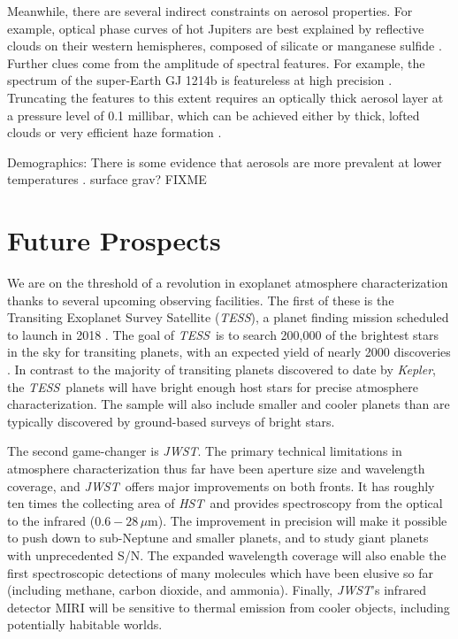 \documentclass[graybox,natbib,nosecnum]{svmult}
\newcommand{\project}[1]{\textsl{#1}}
\newcommand{\JWST}{\project{JWST}}
\newcommand{\HST}{\project{HST}}
\newcommand{\TESS}{\project{TESS}}
\newcommand{\Kepler}{\project{Kepler}}
\begin{document}
Meanwhile, there are several indirect constraints on aerosol properties.  For example, optical phase curves of hot Jupiters are best explained by reflective clouds on their western hemispheres, composed of silicate or manganese sulfide \citep{demory13, oreshenko16, parmentier16}. Further clues come from the amplitude of spectral features. For example, the spectrum of the super-Earth GJ 1214b is featureless at high precision \citep[30 ppm,][]{kreidberg14a}.  Truncating the features to this extent requires an optically thick aerosol layer at a pressure level of 0.1 millibar, which can be achieved either by thick, lofted clouds or very efficient haze formation \citep{morley15}. 

Demographics:
There is some evidence that aerosols are more prevalent at lower temperatures \citep{stevenson16, heng16}. surface grav? FIXME

\section{Future Prospects}
We are on the threshold of a revolution in exoplanet atmosphere characterization thanks to several upcoming observing facilities.  The first of these is the Transiting Exoplanet Survey Satellite (\TESS), a planet finding mission scheduled to launch in 2018 \citep{ricker14}.  The goal of \TESS\ is to search 200,000 of the brightest stars in the sky for transiting planets, with an expected yield of nearly 2000 discoveries \citep{sullivan15}. In contrast to the majority of transiting planets discovered to date by \Kepler, the \TESS\ planets will have bright enough host stars for precise atmosphere characterization. The sample will also include smaller and cooler planets than are typically discovered by ground-based surveys of bright stars. 

The second game-changer is \JWST. The primary technical limitations in atmosphere characterization thus far have been aperture size and wavelength coverage, and \JWST\ offers major improvements on both fronts. It has roughly ten times the collecting area of \HST\, and provides spectroscopy from the optical to the infrared ($0.6 - 28\,\mu$m). The improvement in precision will make it possible to push down to sub-Neptune and smaller planets, and to study giant planets with unprecedented S/N. The expanded wavelength coverage will also enable the first spectroscopic detections of many molecules which have been elusive so far (including methane, carbon dioxide, and ammonia). Finally, \JWST's infrared detector MIRI will be sensitive to thermal emission from cooler objects, including potentially habitable worlds.
\end{document}
